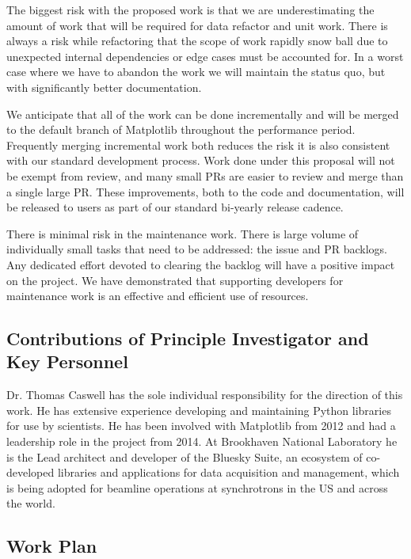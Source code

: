 \documentclass[12pt]{article}
\numberwithin{page}{section}
\begin{document}

The biggest risk with the proposed work is that we are underestimating
the amount of work that will be required for data refactor and unit
work.  There is always a risk while refactoring that the scope of work
rapidly snow ball due to unexpected internal dependencies or edge
cases must be accounted for.  In a worst case where we have to abandon
the work we will maintain the status quo, but with significantly
better documentation.

We anticipate that all of the work can be done incrementally and will
be merged to the default branch of Matplotlib throughout the
performance period.  Frequently merging incremental work both reduces
the risk it is also consistent with our standard development process.
Work done under this proposal will not be exempt from review, and many
small PRs are easier to review and merge than a single large PR.
These improvements, both to the code and documentation, will be
released to users as part of our standard bi-yearly release cadence.

There is minimal risk in the maintenance work.  There is large volume
of individually small tasks that need to be addressed: the issue and
PR backlogs.  Any dedicated effort devoted to clearing the backlog
will have a positive impact on the project.  We have demonstrated that
supporting developers for maintenance work is an effective and
efficient use of resources.


\subsection{Contributions of Principle Investigator and Key Personnel}

Dr. Thomas Caswell has the sole individual responsibility for the
direction of this work.  He has extensive experience developing and
maintaining Python libraries for use by scientists.  He has been
involved with Matplotlib from 2012 and had a leadership role in the
project from 2014.  At Brookhaven National Laboratory he is the Lead
architect and developer of the Bluesky Suite, an ecosystem of
co-developed libraries and applications for data acquisition and
management, which is being adopted for beamline operations at
synchrotrons in the US and across the world.



\subsection{Work Plan}
\end{document}
